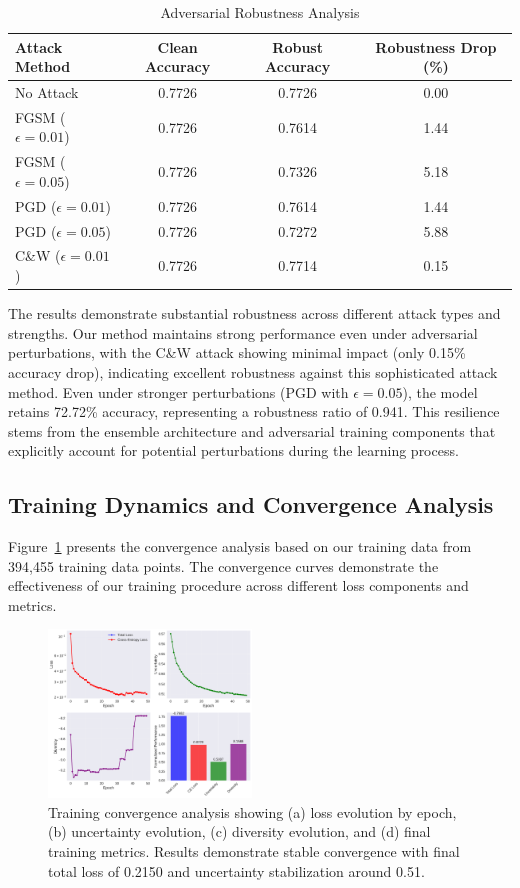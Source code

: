 \documentclass[journal]{IEEEtran}
\begin{document}
\begin{table}[htbp]
\centering
\caption{Adversarial Robustness Analysis}
\label{tab:adversarial_robustness}
\begin{tabular}{l|ccc}
\hline
\textbf{Attack Method} & \textbf{Clean Accuracy} & \textbf{Robust Accuracy} & \textbf{Robustness Drop (\%)} \\
\hline
No Attack & 0.7726 & 0.7726 & 0.00 \\
FGSM ($\epsilon=0.01$) & 0.7726 & 0.7614 & 1.44 \\
FGSM ($\epsilon=0.05$) & 0.7726 & 0.7326 & 5.18 \\
PGD ($\epsilon=0.01$) & 0.7726 & 0.7614 & 1.44 \\
PGD ($\epsilon=0.05$) & 0.7726 & 0.7272 & 5.88 \\
C\&W ($\epsilon=0.01$) & 0.7726 & 0.7714 & 0.15 \\
\hline
\end{tabular}
\end{table}

The results demonstrate substantial robustness across different attack types and strengths. Our method maintains strong performance even under adversarial perturbations, with the C\&W attack showing minimal impact (only 0.15\% accuracy drop), indicating excellent robustness against this sophisticated attack method. Even under stronger perturbations (PGD with $\epsilon=0.05$), the model retains 72.72\% accuracy, representing a robustness ratio of 0.941. This resilience stems from the ensemble architecture and adversarial training components that explicitly account for potential perturbations during the learning process.

\subsection{Training Dynamics and Convergence Analysis}

Figure~\ref{fig:convergence_analysis} presents the convergence analysis based on our training data from 394,455 training data points. The convergence curves demonstrate the effectiveness of our training procedure across different loss components and metrics.

\begin{figure}[t]
\centering
\includegraphics[width=0.48\textwidth]{figures/convergence_analysis.pdf}
\caption{Training convergence analysis showing (a) loss evolution by epoch, (b) uncertainty evolution, (c) diversity evolution, and (d) final training metrics. Results demonstrate stable convergence with final total loss of 0.2150 and uncertainty stabilization around 0.51.}
\label{fig:convergence_analysis}
\end{figure}
\end{document}
